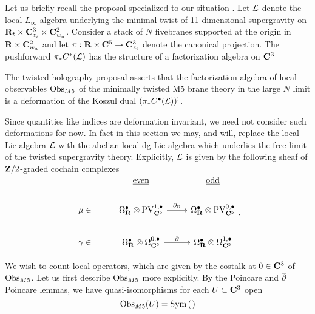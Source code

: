 Let us briefly recall the proposal specialized to our situation . Let $\mathcal L$ denote the local $L_{\infty}$ algebra underlying the minimal twist of 11 dimensional supergravity on $\mathbf{R}_{t}\times \mathbf{C}^{3}_{z_{i}}\times \mathbf{C}^{2}_{w_{a}}$. Consider a stack of $N$ fivebranes supported at the origin in $\mathbf{R}\times \mathbf{C}^{2}_{w_{a}}$ and let $\pi : \mathbf{R}\times \mathbf{C}^{5}\to \mathbf{C}^{3}_{z_{i}}$ denote the canonical projection. The pushforward $\pi_{*} C^{*}(\mathcal L)$ has the structure of a factorization algebra on $\mathbf{C}^{3}$

The twisted holography proposal asserts that the factorization algebra of local observables $\operatorname{Obs}_{M5}$ of the minimally twisted M5 brane theory in the large $N$ limit is a deformation of the Koszul dual $(\pi_{*} C^{\bullet}(\mathcal L))^{!}$.

Since quantities like indices are deformation invariant, we need not consider such deformations for now. In fact in this section we may, and will, replace the local Lie algebra $\mathcal L$ with the abelian local dg Lie algebra which underlies the free limit of the twisted supergravity theory.
Explicitly, $\mathcal L$ is given by the following sheaf of $\mathbf{Z}/2$-graded cochain complexes
\[
\begin{tikzcd}
  &  \ul{\rm even} & \ul{\rm odd} \\
 \mu \in & \Omega^{\bullet}_{\R}\otimes\PV^{1,\bullet}_{\C^{5}} \ar[r, "\del_{\Omega}"] & \Omega^{\bullet}_{\R}\otimes\PV^{0,\bullet}_{\C^{5}}\\
 \gamma \in & \Omega^{\bullet}_{\R}\otimes\Omega^{0,\bullet}_{\C^{5}} \ar[r, "\del"]
& \Omega^{\bullet}_{\R}\otimes\Omega^{1,\bullet}_{\C^{5}}\end{tikzcd}
.\]


\parsec

%

We wish to count local operators, which are given by the costalk at $0\in \mathbf{C}^{3}$ of $\operatorname{Obs}_{M5}$. Let us first describe $\operatorname{Obs}_{M5}$ more explicitly. By the Poincare and $\overline{\partial}$ Poincare lemmas, we have quasi-isomorphisms for each $U\subset \mathbf{C}^{3}$ open
\[
\Obs_{M5}(U) = \Sym \left( \begin{tikzcd}  \end{tikzcd} \right)
\]

